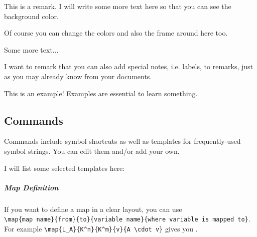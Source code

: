 \documentclass[11pt, a4paper]{article}
\begin{document}
\begin{remark}
  This is a remark. I will write some more text here so that you can see the background color.

  Of course you can change the colors and also the frame around here too.

  Some more text...
\end{remark}

\begin{remark}[to remarks]
  I want to remark that you can also add special notes, i.e. labels, to remarks, just as you may already know from your documents.
\end{remark}

\begin{example}
  This is an example! Examples are essential to learn something.
\end{example}

\subsection{Commands}

Commands include symbol shortcuts as well as templates for frequently-used symbol strings. You can edit them and/or add your own.

I will list some selected templates here:

\subparagraph{Map Definition}

If you want to define a map in a clear layout, you can use \\
\verb|\map{map name}{from}{to}{variable name}{where variable is mapped to}|. \\
For example \verb|\map{L_A}{K^n}{K^m}{v}{A \cdot v}| gives you
.
\end{document}

